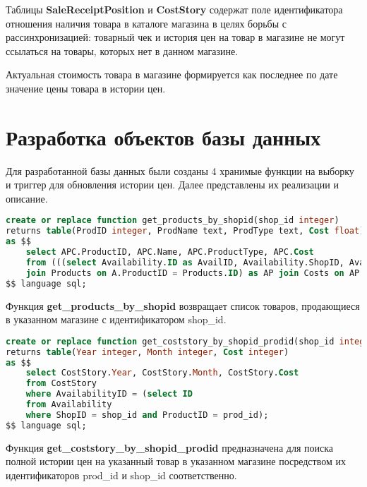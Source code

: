 \documentclass{bmstu}
\begin{document}
Таблицы \textbf{SaleReceiptPosition} и \textbf{CostStory} содержат поле идентификатора отношения наличия товара в каталоге магазина в целях борьбы с рассинхронизацией: товарный чек и история цен на товар в магазине не могут ссылаться на товары, которых нет в данном магазине.

Актуальная стоимость товара в магазине формируется как последнее по дате значение цены товара в истории цен.

\section{Разработка объектов базы данных}

Для разработанной базы данных были созданы 4 хранимые функции на выборку и триггер для обновления истории цен. Далее представлены их реализации и описание.

\begin{lstlisting}[language=sql, caption={Реализация хранимой функции get\_products\_by\_shopid}]
create or replace function get_products_by_shopid(shop_id integer)
returns table(ProdID integer, ProdName text, ProdType text, Cost float)
as $$
	select APC.ProductID, APC.Name, APC.ProductType, APC.Cost
	from (((select Availability.ID as AvailID, Availability.ShopID, Availability.ProductID from Availability where Availability.ShopID = shop_id) as A 
	join Products on A.ProductID = Products.ID) as AP join Costs on AP.AvailID = Costs.AvailabilityID) as APC;
$$ language sql;
\end{lstlisting}


Функция \textbf{get\_products\_by\_shopid} возвращает список товаров, продающиеся в указанном магазине с идентификатором shop\_id. 


\begin{lstlisting}[language=sql, caption={Реализация хранимой функции get\_coststory\_by\_shopid\_prodid}]
create or replace function get_coststory_by_shopid_prodid(shop_id integer, prod_id integer)
returns table(Year integer, Month integer, Cost integer)
as $$
	select CostStory.Year, CostStory.Month, CostStory.Cost
	from CostStory
	where AvailabilityID = (select ID
	from Availability
	where ShopID = shop_id and ProductID = prod_id);
$$ language sql;
\end{lstlisting}


Функция \textbf{get\_coststory\_by\_shopid\_prodid} предназначена для поиска полной истории цен на указанный товар в указанном магазине посредством их идентификаторов prod\_id и shop\_id соответственно.
\end{document}

